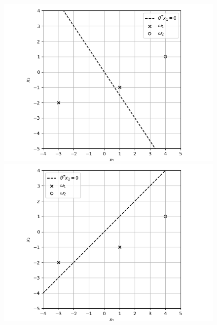 \documentclass[a4paper, 10pt, twoside]{article}
\begin{document}
\begin{enumerate}[a)]
          \begin{figure}[h]
              \centering
              \begin{minipage}[t]{0.32\textwidth}
                  \centering
                  \includegraphics[width=\textwidth]{img/graph5.png}
              \end{minipage}\hfill
              \begin{minipage}[t]{0.32\textwidth}
                  \centering
                  \includegraphics[width=\textwidth]{img/graph7.png}
              \end{minipage}\hfill
              \begin{minipage}[t]{0.32\textwidth}
                  \centering

\end{minipage}
\end{figure}
\end{enumerate}
\end{document}
